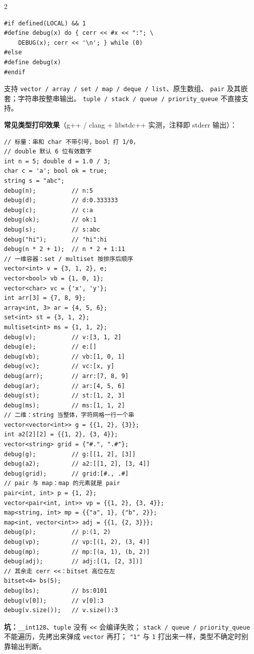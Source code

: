 \begin{multicols*}{2}
\begin{verbatim}
#if defined(LOCAL) && 1
#define debug(x) do { cerr << #x << ":"; \
    DEBUG(x); cerr << '\n'; } while (0)
#else
#define debug(x)
#endif
	\end{verbatim}

	支持 \texttt{vector / array / set / map / deque / list}、原生数组、
	\texttt{pair} 及其嵌套；字符串按整串输出。
	\texttt{tuple / stack / queue / priority\_queue} 不直接支持。

	\textbf{常见类型打印效果}（g++ / clang + libstdc++ 实测，注释即 stderr 输出）：

	\begin{verbatim}
// 标量：串和 char 不带引号，bool 打 1/0，
// double 默认 6 位有效数字
int n = 5; double d = 1.0 / 3;
char c = 'a'; bool ok = true;
string s = "abc";
debug(n);          // n:5
debug(d);          // d:0.333333
debug(c);          // c:a
debug(ok);         // ok:1
debug(s);          // s:abc
debug("hi");       // "hi":hi
debug(n * 2 + 1);  // n * 2 + 1:11
// 一维容器：set / multiset 按排序后顺序
vector<int> v = {3, 1, 2}, e;
vector<bool> vb = {1, 0, 1};
vector<char> vc = {'x', 'y'};
int arr[3] = {7, 8, 9};
array<int, 3> ar = {4, 5, 6};
set<int> st = {3, 1, 2};
multiset<int> ms = {1, 1, 2};
debug(v);          // v:[3, 1, 2]
debug(e);          // e:[]
debug(vb);         // vb:[1, 0, 1]
debug(vc);         // vc:[x, y]
debug(arr);        // arr:[7, 8, 9]
debug(ar);         // ar:[4, 5, 6]
debug(st);         // st:[1, 2, 3]
debug(ms);         // ms:[1, 1, 2]
// 二维：string 当整体，字符网格一行一个串
vector<vector<int>> g = {{1, 2}, {3}};
int a2[2][2] = {{1, 2}, {3, 4}};
vector<string> grid = {"#.", ".#"};
debug(g);          // g:[[1, 2], [3]]
debug(a2);         // a2:[[1, 2], [3, 4]]
debug(grid);       // grid:[#., .#]
// pair 与 map：map 的元素就是 pair
pair<int, int> p = {1, 2};
vector<pair<int, int>> vp = {{1, 2}, {3, 4}};
map<string, int> mp = {{"a", 1}, {"b", 2}};
map<int, vector<int>> adj = {{1, {2, 3}}};
debug(p);          // p:(1, 2)
debug(vp);         // vp:[(1, 2), (3, 4)]
debug(mp);         // mp:[(a, 1), (b, 2)]
debug(adj);        // adj:[(1, [2, 3])]
// 其余走 cerr <<：bitset 高位在左
bitset<4> bs(5);
debug(bs);         // bs:0101
debug(v[0]);       // v[0]:3
debug(v.size());   // v.size():3
	\end{verbatim}

	\textbf{坑：}\texttt{\_\_int128}、\texttt{tuple} 没有 \texttt{<<} 会编译失败；
	\texttt{stack / queue / priority\_queue} 不能遍历，先拷出来弹成 \texttt{vector} 再打；
	\texttt{"1"} 与 \texttt{1} 打出来一样，类型不确定时别靠输出判断。


\end{multicols*}
